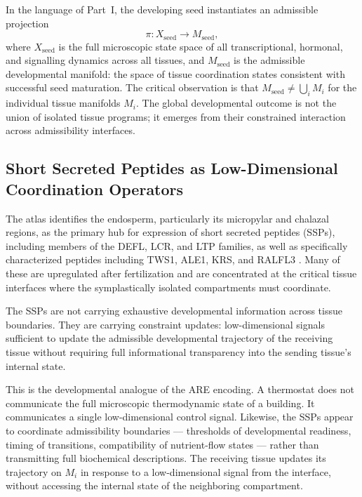 \documentclass[12pt, a4paper]{article}
\theoremstyle{essaystyle}
\begin{document}
In the language of Part~I, the developing seed instantiates an admissible projection
\[
\pi : X_{\mathrm{seed}} \longrightarrow M_{\mathrm{seed}},
\]
where $X_{\mathrm{seed}}$ is the full microscopic state space of all transcriptional,
hormonal, and signalling dynamics across all tissues, and $M_{\mathrm{seed}}$ is the
admissible developmental manifold: the space of tissue coordination states consistent
with successful seed maturation. The critical observation is that
$M_{\mathrm{seed}} \neq \bigcup_i M_i$ for the individual tissue manifolds $M_i$.
The global developmental outcome is not the union of isolated tissue programs; it
emerges from their constrained interaction across admissibility interfaces.

\subsection{Short Secreted Peptides as Low-Dimensional Coordination Operators}

The atlas identifies the endosperm, particularly its micropylar and chalazal regions,
as the primary hub for expression of short secreted peptides (SSPs), including
members of the DEFL, LCR, and LTP families, as well as specifically characterized
peptides including TWS1, ALE1, KRS, and RALFL3 \citep{martin2026atlas}. Many of
these are upregulated after fertilization and are concentrated at the critical tissue
interfaces where the symplastically isolated compartments must coordinate.

The SSPs are not carrying exhaustive developmental information across tissue boundaries.
They are carrying constraint updates: low-dimensional signals sufficient to update
the admissible developmental trajectory of the receiving tissue without requiring
full informational transparency into the sending tissue's internal state.

This is the developmental analogue of the ARE encoding. A thermostat does not
communicate the full microscopic thermodynamic state of a building. It communicates
a single low-dimensional control signal. Likewise, the SSPs appear to coordinate
admissibility boundaries --- thresholds of developmental readiness, timing of
transitions, compatibility of nutrient-flow states --- rather than transmitting full
biochemical descriptions. The receiving tissue updates its trajectory on $M_i$ in
response to a low-dimensional signal from the interface, without accessing the
internal state of the neighboring compartment.
\end{document}
